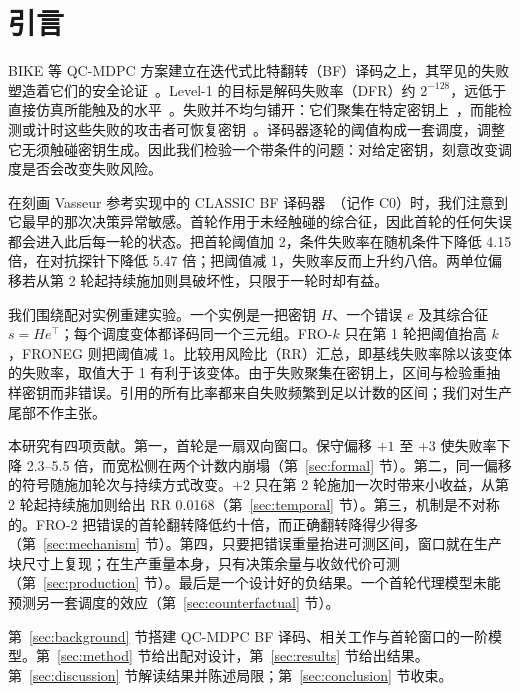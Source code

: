 \section{引言}\label{sec:intro}

BIKE 等 QC-MDPC 方案建立在迭代式比特翻转（BF）译码之上，其罕见的失败塑造着它们的安全论证~\cite{misoczki2013mdpc,bike2024spec,alagic2025nist}。Level-1 的目标是解码失败率（DFR）约 $2^{-128}$，远低于直接仿真所能触及的水平~\cite{sendrier2019dfr,vasseur2021thesis}。失败并不均匀铺开：它们聚集在特定密钥上~\cite{guo2016key,wang2023weak,nosouhi2023weakkey}，而能检测或计时这些失败的攻击者可恢复密钥~\cite{eaton2018timing}。译码器逐轮的阈值构成一套调度，调整它无须触碰密钥生成。因此我们检验一个带条件的问题：对给定密钥，刻意改变调度是否会改变失败风险。

在刻画 Vasseur 参考实现中的 CLASSIC BF 译码器~\cite{vasseur2021thesis}（记作 C0）时，我们注意到它最早的那次决策异常敏感。首轮作用于未经触碰的综合征，因此首轮的任何失误都会进入此后每一轮的状态。把首轮阈值加 2，条件失败率在随机条件下降低 4.15 倍，在对抗探针下降低 5.47 倍；把阈值减 1，失败率反而上升约八倍。两单位偏移若从第 2 轮起持续施加则具破坏性，只限于一轮时却有益。

我们围绕配对实例重建实验。一个实例是一把密钥 $H$、一个错误 $e$ 及其综合征 $s=He^{\top}$；每个调度变体都译码同一个三元组。FRO-$k$ 只在第 1 轮把阈值抬高 $k$，FRONEG 则把阈值减 1。比较用风险比（RR）汇总，即基线失败率除以该变体的失败率，取值大于 1 有利于该变体。由于失败聚集在密钥上，区间与检验重抽样密钥而非错误。引用的所有比率都来自失败频繁到足以计数的区间；我们对生产尾部不作主张。

本研究有四项贡献。第一，首轮是一扇双向窗口。保守偏移 $+1$ 至 $+3$ 使失败率下降 2.3--5.5 倍，而宽松侧在两个计数内崩塌（第~\ref{sec:formal} 节）。第二，同一偏移的符号随施加轮次与持续方式改变。$+2$ 只在第 2 轮施加一次时带来小收益，从第 2 轮起持续施加则给出 RR 0.0168（第~\ref{sec:temporal} 节）。第三，机制是不对称的。FRO-2 把错误的首轮翻转降低约十倍，而正确翻转降得少得多（第~\ref{sec:mechanism} 节）。第四，只要把错误重量抬进可测区间，窗口就在生产块尺寸上复现；在生产重量本身，只有决策余量与收敛代价可测（第~\ref{sec:production} 节）。最后是一个设计好的负结果。一个首轮代理模型未能预测另一套调度的效应（第~\ref{sec:counterfactual} 节）。

第~\ref{sec:background} 节搭建 QC-MDPC BF 译码、相关工作与首轮窗口的一阶模型。第~\ref{sec:method} 节给出配对设计，第~\ref{sec:results} 节给出结果。第~\ref{sec:discussion} 节解读结果并陈述局限；第~\ref{sec:conclusion} 节收束。

